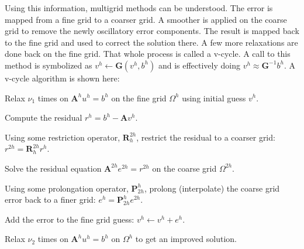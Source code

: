 \documentclass[12pt]{article}
\newcommand{\ve}[1]{\ensuremath{\mathbf{#1}}}
\begin{document}
Using this information, multigrid methods can be understood. The error is mapped from a fine grid to a coarser grid. A smoother is applied on the coarse grid to remove the newly oscillatory error components. The result is mapped back to the fine grid and used to correct the solution there. A few more relaxations are done back on the fine grid. That whole process is called a v-cycle. %
A call to this method is symbolized as $v^h \leftarrow \ve{G}(v^h, b^h)$ and is effectively doing $v^{h} \approx \ve{G}^{-1}b^{h}$. A v-cycle algorithm is shown here:
%
\begin{list}{}{}
    \item Relax $\nu_1$ times on $\ve{A}^h u^h = b^h$ on the fine grid $\Omega^h$ using initial guess $v^h$.
    \item Compute the residual $r^h = b^h - \ve{A} v^h$. 
    \item Using some restriction operator, $\ve{R}_h^{2h}$, restrict the residual to a coarser grid: $r^{2h} =  \ve{R}_h^{2h} r^h$. 
    \item Solve the residual equation $\ve{A}^{2h} e^{2h} = r^{2h}$ on the coarse grid $\Omega^{2h}$. 
    \item Using some prolongation operator, $\ve{P}_{2h}^h$, prolong (interpolate) the coarse grid error back to a finer grid: $e^h = \ve{P}_{2h}^h e^{2h}$. 
    \item Add the error to the fine grid guess: $v^h \leftarrow v^h + e^h$. 
    \item Relax $\nu_2$ times on $\ve{A}^h u^h = b^h$ on $\Omega^h$ to get an improved solution. 
\end{list}
\end{document}
